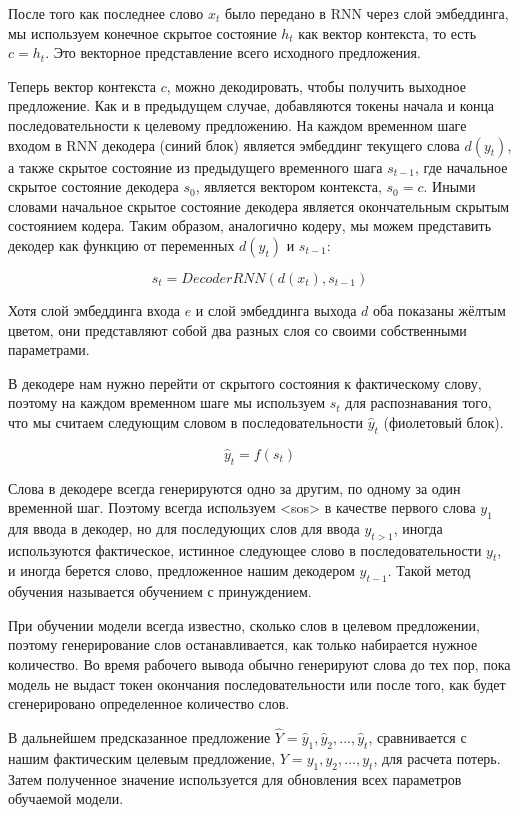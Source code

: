     После того как последнее слово $x_t$ было передано в RNN через слой эмбеддинга, мы используем конечное скрытое состояние $h_t$ как вектор контекста, то есть $c = h_t$. Это векторное представление всего исходного предложения.
    
    Теперь вектор контекста $c$, можно декодировать, чтобы получить выходное предложение. Как и в предыдущем случае, добавляются токены начала и конца последовательности к целевому предложению. На каждом временном шаге входом в RNN декодера (синий блок) является эмбеддинг текущего слова $d(y_t)$, а также скрытое состояние из предыдущего временного шага $s_{t-1}$, где начальное скрытое состояние декодера $s_0$, является вектором контекста, $s_0 = c$. Иными словами начальное скрытое состояние декодера является окончательным скрытым состоянием кодера. Таким образом, аналогично кодеру, мы можем представить декодер как функцию от переменных $d(y_t)$ и $s_{t-1}$:
    
    $$
	    s_t = DecoderRNN(d(x_t), s_{t-1})
	$$
	
	Хотя слой эмбеддинга входа $e$ и слой эмбеддинга выхода $d$ оба показаны жёлтым цветом, они представляют собой два разных слоя со своими собственными параметрами.

    В декодере нам нужно перейти от скрытого состояния к фактическому слову, поэтому на каждом временном шаге мы используем $s_t$ для распознавания того, что мы считаем следующим словом в последовательности $\hat{y}_t$ (фиолетовый блок).

    $$
        \hat{y}_t = f(s_t)
    $$
    
    Слова в декодере всегда генерируются одно за другим, по одному за один временной шаг. Поэтому всегда используем <sos> в качестве первого слова $y_1$ для ввода в декодер, но для последующих слов для ввода $y_{t>1}$, иногда используются фактическое, истинное следующее слово в последовательности $y_t$, и иногда берется слово, предложенное нашим декодером $\hat{y}_{t-1}$. Такой метод обучения называется обучением с принуждением.

    При обучении модели всегда известно, сколько слов в целевом предложении, поэтому генерирование слов останавливается, как только набирается нужное количество. Во время рабочего вывода обычно генерируют слова до тех пор, пока модель не выдаст токен окончания последовательности или после того, как будет сгенерировано определенное количество слов.
    
    В дальнейшем предсказанное предложение $\hat{Y} = { \hat{y}_1, \hat{y}_2, ..., \hat{y}_t }$, сравнивается с нашим фактическим целевым предложение, $Y = { y_1, y_2, ..., y_t }$, для расчета потерь. Затем полученное значение используется для обновления всех параметров обучаемой модели.

